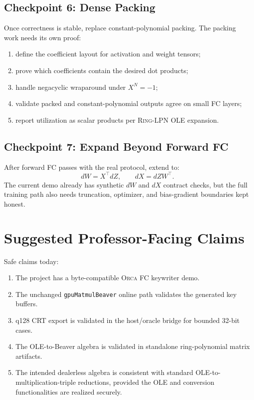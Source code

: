 \documentclass[11pt]{article}
\newcommand{\Orca}{\textsc{Orca}}
\newcommand{\RingLPN}{\textsc{Ring-LPN}}
\begin{document}
\subsection*{Checkpoint 6: Dense Packing}

Once correctness is stable, replace constant-polynomial packing. The packing
work needs its own proof:
\begin{enumerate}[leftmargin=*]
  \item define the coefficient layout for activation and weight tensors;
  \item prove which coefficients contain the desired dot products;
  \item handle negacyclic wraparound under \(X^N=-1\);
  \item validate packed and constant-polynomial outputs agree on small FC
  layers;
  \item report utilization as scalar products per \RingLPN{} OLE expansion.
\end{enumerate}

\subsection*{Checkpoint 7: Expand Beyond Forward FC}

After forward FC passes with the real protocol, extend to:
\[
  dW = X^\top dZ,\qquad dX = dZ W^\top.
\]
The current demo already has synthetic \(dW\) and \(dX\) contract checks, but
the full training path also needs truncation, optimizer, and bias-gradient
boundaries kept honest.

\section{Suggested Professor-Facing Claims}

Safe claims today:
\begin{enumerate}[leftmargin=*]
  \item The project has a byte-compatible \Orca{} FC keywriter demo.
  \item The unchanged \texttt{gpuMatmulBeaver} online path validates the
  generated key buffers.
  \item q128 CRT export is validated in the host/oracle bridge for bounded
  32-bit cases.
  \item The OLE-to-Beaver algebra is validated in standalone
  ring-polynomial matrix artifacts.
  \item The intended dealerless algebra is consistent with standard OLE-to-
  multiplication-triple reductions, provided the OLE and conversion
  functionalities are realized securely.
\end{enumerate}
\end{document}

